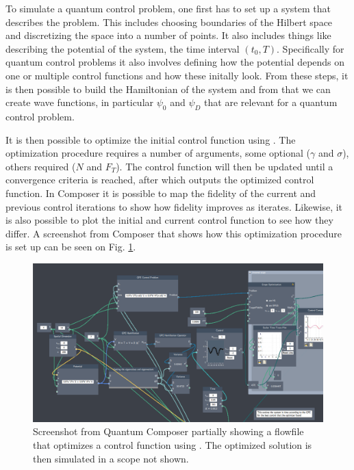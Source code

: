 \documentclass[a4paper, twocolumn]{revtex4-1}
\begin{document}
To simulate a quantum control problem, one first has to set up a system that describes the problem. This includes choosing boundaries of the Hilbert space and discretizing the space into a number of points. It also includes things like describing the potential of the system, the time interval $(t_0, T)$. Specifically for quantum control problems it also involves defining how the potential depends on one or multiple control functions and how these initally look. From these steps, it is then possible to build the Hamiltonian of the system and from that we can create wave functions, in particular $\psi_0$ and $\psi_D$ that are relevant for a quantum control problem.


It is then possible to optimize the initial control function using . The optimization procedure requires a number of arguments, some optional ($\gamma$ and $\sigma$), others required ($N$ and $F_T$). The control function will then be updated until a convergence criteria is reached, after which  outputs the optimized control function. In Composer it is possible to map the fidelity of the current and previous control iterations to show how fidelity improves as  iterates. Likewise, it is also possible to plot the initial and current control function to see how they differ. A screenshot from Composer that shows how this optimization procedure is set up can be seen on Fig. \ref{fig:composerScreens}.

\begin{figure}
	\centering
	\includegraphics[width=\textwidth]{graphics/composerScreens/composerWide.png}
	\caption{Screenshot from Quantum Composer partially showing a flowfile that optimizes a control function using . The optimized solution is then simulated in a scope not shown.}
	\label{fig:composerScreens}
\end{figure}
\end{document}
